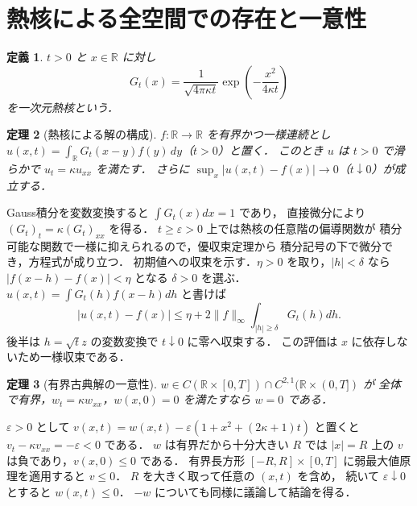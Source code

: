 \documentclass[a5paper,10pt,onecolumn]{jsarticle}
\makeatletter
\theoremstyle{mathnotetheorem}
\newtheorem{theorem}{定理}[section]
\newtheorem{definition}[theorem]{定義}
\renewcommand{\proofname}{証明}
\renewenvironment{proof}[1][\proofname]{%
  \par\pushQED{\qed}\normalfont\topsep4\p@\@plus2\p@\relax
  \trivlist\item[\hskip\labelsep\bfseries #1]\ignorespaces
}{\popQED\endtrivlist\@endpefalse}
\newcommand{\norm}[1]{\lVert #1\rVert}
\makeatother
\begin{document}
\section{熱核による全空間での存在と一意性}
\begin{definition}
$t>0$ と $x\in\mathbb R$ に対し
\[
 G_t(x)=\frac1{\sqrt{4\pi\kappa t}}
 \exp\!\left(-\frac{x^2}{4\kappa t}\right)
\]
を一次元熱核という．
\end{definition}
\begin{theorem}[熱核による解の構成]
$f:\mathbb R\to\mathbb R$ を有界かつ一様連続とし
$u(x,t)=\int_{\mathbb R}G_t(x-y)f(y)\,dy$（$t>0$）と置く．
このとき $u$ は $t>0$ で滑らかで $u_t=\kappa u_{xx}$ を満たす．
さらに $\sup_x|u(x,t)-f(x)|\to0$（$t\downarrow0$）が成立する．
\end{theorem}
\begin{proof}
Gauss積分を変数変換すると $\int G_t(x)dx=1$ であり，
直接微分により $(G_t)_t=\kappa(G_t)_{xx}$ を得る．
$t\ge\varepsilon>0$ 上では熱核の任意階の偏導関数が
積分可能な関数で一様に抑えられるので，優収束定理から
積分記号の下で微分でき，方程式が成り立つ．
初期値への収束を示す．$\eta>0$ を取り，$|h|<\delta$ なら
$|f(x-h)-f(x)|<\eta$ となる $\delta>0$ を選ぶ．
$u(x,t)=\int G_t(h)f(x-h)dh$ と書けば
\[
 |u(x,t)-f(x)|\le\eta+
 2\norm f_\infty\int_{|h|\ge\delta}G_t(h)dh.
\]
後半は $h=\sqrt t z$ の変数変換で $t\downarrow0$ に零へ収束する．
この評価は $x$ に依存しないため一様収束である．
\end{proof}
\begin{theorem}[有界古典解の一意性]
$w\in C(\mathbb R\times[0,T])\cap C^{2,1}(\mathbb R\times(0,T])$ が
全体で有界，$w_t=\kappa w_{xx}$，$w(x,0)=0$ を満たすなら $w=0$ である．
\end{theorem}
\begin{proof}
$\varepsilon>0$ として
$v(x,t)=w(x,t)-\varepsilon(1+x^2+(2\kappa+1)t)$ と置くと
$v_t-\kappa v_{xx}=-\varepsilon<0$ である．
$w$ は有界だから十分大きい $R$ では
$|x|=R$ 上の $v$ は負であり，$v(x,0)\le0$ である．
有界長方形 $[-R,R]\times[0,T]$ に弱最大値原理を適用すると $v\le0$．
$R$ を大きく取って任意の $(x,t)$ を含め，
続いて $\varepsilon\downarrow0$ とすると $w(x,t)\le0$．
$-w$ についても同様に議論して結論を得る．
\end{proof}
\end{document}
